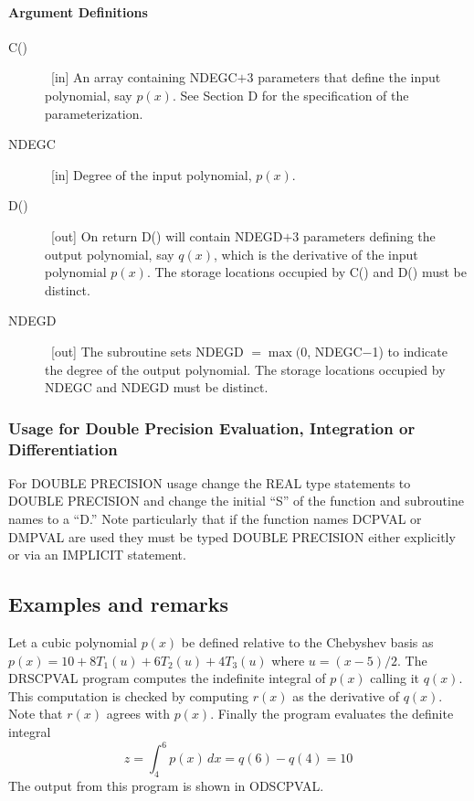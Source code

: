 \documentclass[twoside]{MATH77}
\begin{document}
\paragraph{Argument Definitions}
\begin{description}
\item[C()]  \ [in] An array containing NDEGC$+3$ parameters that define the
input polynomial, say $p(x)$. See Section D for the specification of the
parameterization.

\item[NDEGC]  \ [in] Degree of the input polynomial, $p(x).$

\item[D()]  \ [out] On return D() will contain NDEGD$+3$ parameters defining
the output polynomial, say $q(x)$, which is the derivative of the input
polynomial $p(x)$. The storage locations occupied by C() and D() must be
distinct.
\newpage

\item[NDEGD]  \ [out] The subroutine sets NDEGD $=\max (0$, NDEGC$-$1) to
indicate the degree of the output polynomial. The storage locations occupied
by NDEGC and NDEGD must be distinct.
\end{description}
\subsubsection{Usage for Double Precision Evaluation, Integration or
Differentiation}

For DOUBLE PRECISION usage change the REAL type statements to DOUBLE
PRECISION and change the initial ``S'' of the function and subroutine names
to a ``D.'' Note particularly that if the function names DCPVAL or DMPVAL
are used they must be typed DOUBLE PRECISION either explicitly or via an
IMPLICIT statement.

\subsection{Examples and remarks}

Let a cubic polynomial $p(x)$ be defined relative to the Chebyshev basis as $%
p(x)=10+8T_1(u)+6T_2(u)+4T_3(u)$ where $u=(x-5)/2$. The DRSCPVAL program
computes the indefinite integral of $p(x)$ calling it $q(x)$. This
computation is checked by computing $r(x)$ as the derivative of $q(x)$. Note
that $r(x)$ agrees with $p(x)$. Finally the program evaluates the definite
integral%
\begin{equation*}
z=\int_4^6p(x)\,dx=q(6)-q(4)=10
\end{equation*}
The output from this program is shown in ODSCPVAL.
\end{document}

